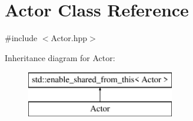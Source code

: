 \hypertarget{class_actor}{}\section{Actor Class Reference}
\label{class_actor}


{\ttfamily \#include $<$Actor.\+hpp$>$}

Inheritance diagram for Actor\+:\begin{figure}[H]
\begin{center}
\leavevmode
\includegraphics[height=2.000000cm]{class_actor}
\end{center}
\end{figure}
